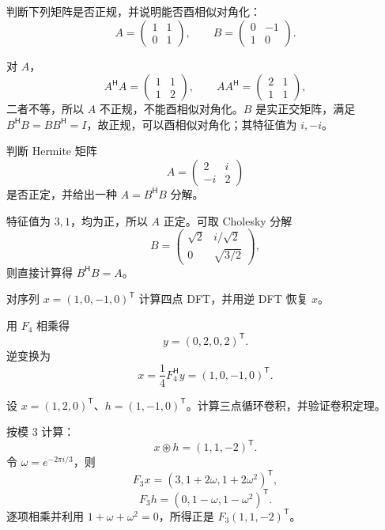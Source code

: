 \begin{exercise}[level=standard]
判断下列矩阵是否正规，并说明能否酉相似对角化：
\[
A=\begin{pmatrix}1&1\\0&1\end{pmatrix},
\qquad
B=\begin{pmatrix}0&-1\\1&0\end{pmatrix}.
\]
\begin{solution}
对 $A$，
\[
A^{\mathsf H}A=\begin{pmatrix}1&1\\1&2\end{pmatrix},
\qquad
AA^{\mathsf H}=\begin{pmatrix}2&1\\1&1\end{pmatrix},
\]
二者不等，所以 $A$ 不正规，不能酉相似对角化。$B$ 是实正交矩阵，满足
$B^{\mathsf H}B=BB^{\mathsf H}=I$，故正规，可以酉相似对角化；其特征值为 $i,-i$。
\end{solution}
\end{exercise}

\begin{exercise}[level=standard]
判断 Hermite 矩阵
\[
A=\begin{pmatrix}2&i\\-i&2\end{pmatrix}
\]
是否正定，并给出一种 $A=B^{\mathsf H}B$ 分解。
\begin{solution}
特征值为 $3,1$，均为正，所以 $A$ 正定。可取 Cholesky 分解
\[
B=\begin{pmatrix}\sqrt2&i/\sqrt2\\0&\sqrt{3/2}\end{pmatrix},
\]
则直接计算得 $B^{\mathsf H}B=A$。
\end{solution}
\end{exercise}

\begin{exercise}[level=standard]
对序列 $x=(1,0,-1,0)^{\mathsf T}$ 计算四点 DFT，并用逆 DFT 恢复 $x$。
\begin{solution}
用 $F_4$ 相乘得
\[
y=(0,2,0,2)^{\mathsf T}.
\]
逆变换为
\[
x=\frac14F_4^{\mathsf H}y
=(1,0,-1,0)^{\mathsf T}.
\]
\end{solution}
\end{exercise}

\begin{exercise}[level=standard]
设 $x=(1,2,0)^{\mathsf T}$、$h=(1,-1,0)^{\mathsf T}$。计算三点循环卷积，并验证卷积定理。
\begin{solution}
按模 $3$ 计算：
\[
x\mathbin{\circledast}h=(1,1,-2)^{\mathsf T}.
\]
令 $\omega=e^{-2\pi i/3}$，则
\[
F_3x=(3,1+2\omega,1+2\omega^2)^{\mathsf T},
\]
\[
F_3h=(0,1-\omega,1-\omega^2)^{\mathsf T}.
\]
逐项相乘并利用 $1+\omega+\omega^2=0$，所得正是
$F_3(1,1,-2)^{\mathsf T}$。
\end{solution}
\end{exercise}

